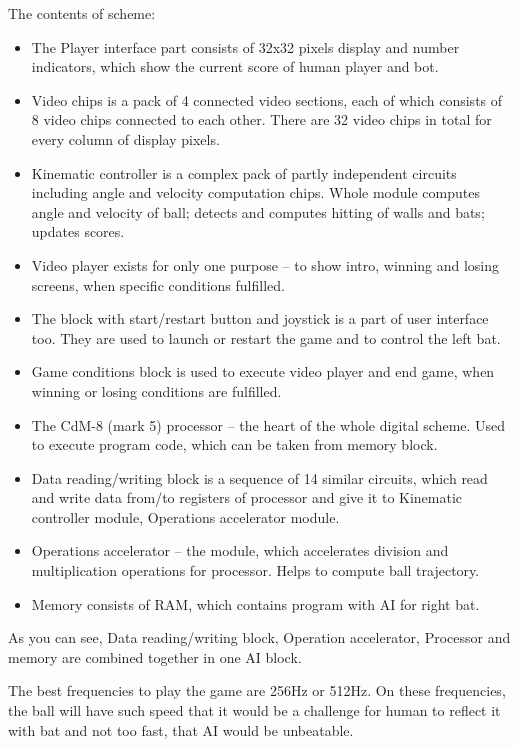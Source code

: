 \documentclass[12pt,a4paper]{article}
\begin{document}
    The contents of scheme:
    \begin{itemize}
        \item The Player interface part consists of 32x32 pixels display and number indicators, which show the current score of human player and bot.
        \item Video chips is a pack of 4 connected video sections, each of which consists of 8 video chips connected to each other. There are 32 video chips in total for every column of display pixels.
        \item Kinematic controller is a complex pack of partly independent circuits including angle and velocity computation chips. Whole module computes angle and velocity of ball; detects and computes hitting of walls and bats; updates scores.
        \item Video player exists for only one purpose – to show intro, winning and losing screens, when specific conditions fulfilled.
        \item The block with start/restart button and joystick is a part of user interface too. They are used to launch or restart the game and to control the left bat.
        \item Game conditions block is used to execute video player and end game, when winning or losing conditions are fulfilled.
        \item The CdM-8 (mark 5) processor – the heart of the whole digital scheme. Used to execute program code, which can be taken from memory block.
        \item Data reading/writing block is a sequence of 14 similar circuits, which read and write data from/to registers of processor and give it to Kinematic controller module, Operations accelerator module.
        \item  Operations accelerator – the module, which accelerates division and multiplication operations for processor. Helps to compute ball trajectory.
        \item Memory consists of RAM, which contains program with AI for right bat.
    \end{itemize}

    As you can see, Data reading/writing block, Operation accelerator, Processor and memory are combined together in one AI block.

    The best frequencies to play the game are 256Hz or 512Hz. On these frequencies, the ball will have such speed that it would be a challenge for human to reflect it with bat and not too fast, that AI would be unbeatable. 
\end{document}
